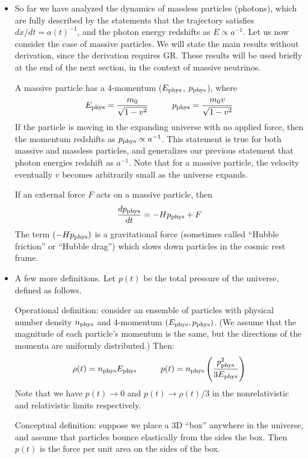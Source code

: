 \documentclass[aps,prd,superscriptaddress,groupedaddress,nofootinbib,nobibnotes]{revtex4}
\newcommand{\be}{\begin{equation}}
\newcommand{\ee}{\end{equation}}
\begin{document}
\begin{itemize}

\item
So far we have analyzed the dynamics of massless particles (photons), 
which are fully described by the statements that the trajectory satisfies $dx/dt=a(t)^{-1}$, 
and the photon energy redshifts as $E \propto a^{-1}$.  
Let us now consider the case of massive particles.
We will state the main results without derivation, since the derivation requires GR.
These results will be used briefly at the end of the next section, in the context of massive neutrinos.

A massive particle has a 4-momentum ($E_{\rm phys}$, $p_{\rm phys}$), where
\be
E_{\rm phys} = \frac{m_0}{\sqrt{1-v^2}}
  \hspace{1cm}
p_{\rm phys} = \frac{m_0 v}{\sqrt{1-v^2}}
\ee
If the particle is moving in the expanding universe with no applied force,
then the momentum redshifts as $p_{\rm phys} \propto a^{-1}$.  This statement
is true for both massive and massless particles, and generalizes our previous
statement that photon energies redshift as $a^{-1}$.  Note that for a massive
particle, the velocity eventually $v$ becomes arbitrarily small as the universe
expands.

If an external force $F$ acts on a massive particle, then
\be
\frac{dp_{\rm phys}}{dt} = - H p_{\rm phys} + F
\ee
The term $(-H p_{\rm phys})$ is a gravitational force (sometimes called ``Hubble friction'' or ``Hubble drag'')
which slows down particles in the cosmic rest frame.

\item
A few more definitions.
Let $p(t)$ be the total pressure of the universe, defined as follows.

Operational definition: consider an ensemble of particles with physical number density $n_{\rm phys}$
and 4-momentum $(E_{\rm phys}, p_{\rm phys})$.  (We assume that the magnitude of each particle's momentum
is the same, but the directions of the momenta are uniformly distributed.)  Then:
\be
\rho(t) = n_{\rm phys} E_{\rm phys}
  \hspace{1cm}
p(t) = n_{\rm phys} \left( \frac{p_{\rm phys}^2}{3 E_{\rm phys}} \right)  \label{eq:p_operational}
\ee
Note that we have $p(t) \rightarrow 0$ and $p(t) \rightarrow \rho(t)/3$ in the nonrelativistic
and relativistic limits respectively.

Conceptual definition: suppose we place a 3D ``box'' anywhere in the universe, and assume
that particles bounce elastically from the sides the box.  Then $p(t)$ is the force per
unit area on the sides of the box.


\end{itemize}
\end{document}
